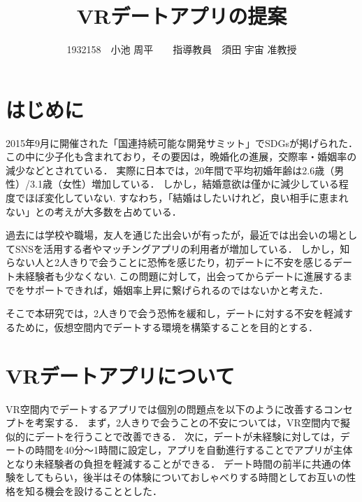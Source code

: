 \documentclass[twocolumn,10pt,a4j]{ltjsarticle}
\title{VRデートアプリの提案}
\author{1932158　小池 周平　　指導教員　須田 宇宙 准教授}
\date{ }
\begin{document}
\maketitle

\section{はじめに}


2015年9月に開催された「国連持続可能な開発サミット」でSDGsが掲げられた．この中に少子化も含まれており，その要因は，晩婚化の進展\cite{sasaki2012}，交際率・婚姻率の減少\cite{naikakufu2019}などとされている．
実際に日本では，20年間で平均初婚年齢は2.6歳（男性）/3.1歳（女性）増加している．
しかし，結婚意欲は僅かに減少している程度でほぼ変化していない.
すなわち，「結婚はしたいけれど，良い相手に恵まれない」との考えが大多数を占めている\cite{naikakufu2019}．

過去には学校や職場，友人を通じた出会いが有ったが，最近では出会いの場としてSNSを活用する者やマッチングアプリの利用者が増加している．
しかし，知らない人と2人きりで会うことに恐怖を感じたり，初デートに不安を感じるデート未経験者も少なくない\cite{prtimes,yoshimura2020}.
この問題に対して，出会ってからデートに進展するまでをサポートできれば，婚姻率上昇に繋げられるのではないかと考えた．

そこで本研究では，2人きりで会う恐怖を緩和し，デートに対する不安を軽減するために，仮想空間内でデートする環境を構築することを目的とする．





\section{VRデートアプリについて}
VR空間内でデートするアプリでは個別の問題点を以下のように改善するコンセプトを考案する．
まず，2人きりで会うことの不安については，VR空間内で擬似的にデートを行うことで改善できる．
次に，デートが未経験に対しては，デートの時間を40分〜1時間に設定し，アプリを自動進行することでアプリが主体となり未経験者の負担を軽減することができる．
デート時間の前半に共通の体験をしてもらい，後半はその体験についておしゃべりする時間としてお互いの性格を知る機会を設けることとした．
\end{document}
